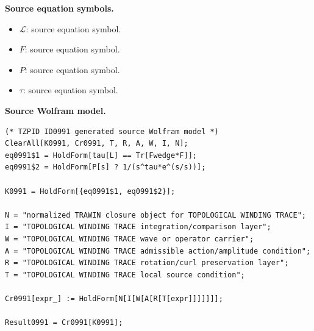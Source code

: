 \begin{minipage}[t]{0.49\linewidth}
\begingroup
\small
\raggedright
\textbf{Source equation symbols.}\par
\begin{itemize}[leftmargin=1.35em,itemsep=1pt,topsep=1pt,parsep=0pt]
    \item $\mathcal{L}$: source equation symbol.
    \item $F$: source equation symbol.
    \item $P$: source equation symbol.
    \item $\tau$: source equation symbol.
\end{itemize}
\endgroup
\end{minipage}\hfill
\begin{minipage}[t]{0.47\linewidth}
\begingroup
\scriptsize
\raggedright
\textbf{Source Wolfram model.}\par
\begin{Verbatim}[fontsize=\tiny,breaklines=true,breakanywhere=true]
(* TZPID ID0991 generated source Wolfram model *)
ClearAll[K0991, Cr0991, T, R, A, W, I, N];
eq0991$1 = HoldForm[tau[L] == Tr[Fwedge*F]];
eq0991$2 = HoldForm[P[s] ? 1/(s^tau*e^(s/s))];

K0991 = HoldForm[{eq0991$1, eq0991$2}];

N = "normalized TRAWIN closure object for TOPOLOGICAL WINDING TRACE";
I = "TOPOLOGICAL WINDING TRACE integration/comparison layer";
W = "TOPOLOGICAL WINDING TRACE wave or operator carrier";
A = "TOPOLOGICAL WINDING TRACE admissible action/amplitude condition";
R = "TOPOLOGICAL WINDING TRACE rotation/curl preservation layer";
T = "TOPOLOGICAL WINDING TRACE local source condition";

Cr0991[expr_] := HoldForm[N[I[W[A[R[T[expr]]]]]]];

Result0991 = Cr0991[K0991];
\end{Verbatim}
\endgroup
\end{minipage}

